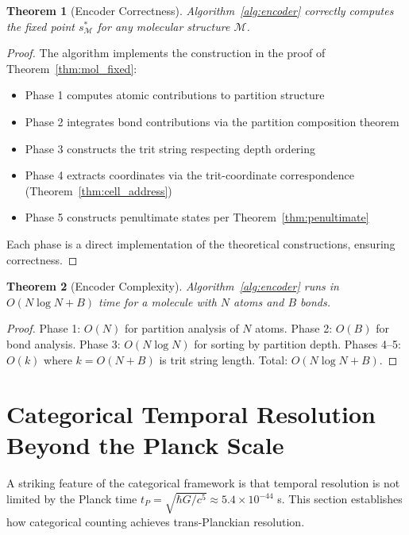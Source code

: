 \documentclass[twocolumn,10pt,a4paper]{article}
\newtheorem{theorem}{Theorem}[section]
\begin{document}
\begin{theorem}[Encoder Correctness]
\label{thm:encoder_correct}
Algorithm~\ref{alg:encoder} correctly computes the fixed point $s^*_\mathcal{M}$ for any molecular structure $\mathcal{M}$.
\end{theorem}

\begin{proof}
The algorithm implements the construction in the proof of Theorem~\ref{thm:mol_fixed}:
\begin{itemize}
    \item Phase 1 computes atomic contributions to partition structure
    \item Phase 2 integrates bond contributions via the partition composition theorem
    \item Phase 3 constructs the trit string respecting depth ordering
    \item Phase 4 extracts coordinates via the trit-coordinate correspondence (Theorem~\ref{thm:cell_address})
    \item Phase 5 constructs penultimate states per Theorem~\ref{thm:penultimate}
\end{itemize}
Each phase is a direct implementation of the theoretical constructions, ensuring correctness.
\end{proof}

\begin{theorem}[Encoder Complexity]
Algorithm~\ref{alg:encoder} runs in $O(N \log N + B)$ time for a molecule with $N$ atoms and $B$ bonds.
\end{theorem}

\begin{proof}
Phase 1: $O(N)$ for partition analysis of $N$ atoms.
Phase 2: $O(B)$ for bond analysis.
Phase 3: $O(N \log N)$ for sorting by partition depth.
Phases 4--5: $O(k)$ where $k = O(N + B)$ is trit string length.
Total: $O(N \log N + B)$.
\end{proof}

\section{Categorical Temporal Resolution Beyond the Planck Scale}
\label{sec:trans_planckian}

A striking feature of the categorical framework is that temporal resolution is not limited by the Planck time $t_P = \sqrt{\hbar G/c^5} \approx 5.4 \times 10^{-44}$ s. This section establishes how categorical counting achieves trans-Planckian resolution.
\end{document}
